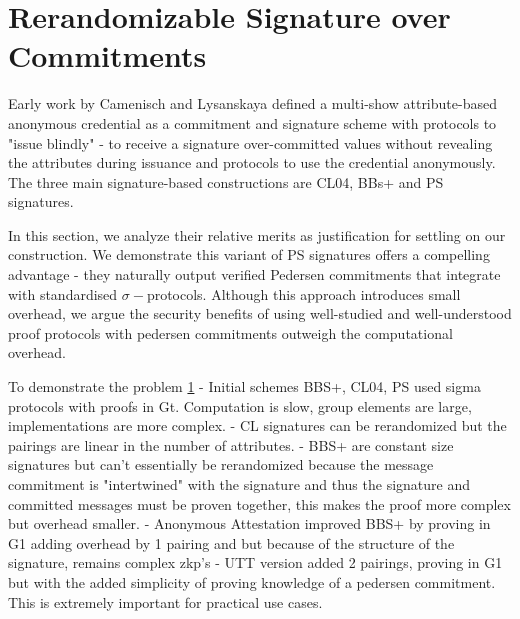 % 
% 















% 
% 
\newpage
\section{Rerandomizable Signature over Commitments}
Early work by Camenisch and Lysanskaya defined a multi-show attribute-based anonymous credential as a commitment and signature scheme with protocols to "issue blindly" - to receive a signature over-committed values without revealing the attributes during issuance and protocols to use the credential anonymously. The three main signature-based constructions are CL04, BBs+ and PS signatures. 

\noindent In this section, we analyze their relative merits as justification for settling on our construction. We demonstrate this variant of PS signatures offers a compelling advantage - they naturally output verified Pedersen commitments that integrate with standardised $\sigma-$protocols. Although this approach introduces small overhead, we argue the security benefits of using well-studied and well-understood proof protocols with pedersen commitments outweigh the computational overhead. 

To demonstrate the problem \ref{}
- Initial schemes BBS+, CL04, PS used sigma protocols with proofs in Gt. Computation is slow, group elements are large, implementations are more complex. 
- CL signatures can be rerandomized but the pairings are linear in the number of attributes. 
- BBS+ are constant size signatures but can't essentially be rerandomized because the message commitment is "intertwined" with the signature and thus the signature and committed messages must be proven together, this makes the proof more complex but overhead smaller.
- Anonymous Attestation improved BBS+ by proving in G1 adding overhead by 1 pairing and but because of the structure of the signature, remains complex zkp's
- UTT version added 2 pairings, proving in G1 but with the added simplicity of proving knowledge of a pedersen commitment. This is extremely important for practical use cases. 


